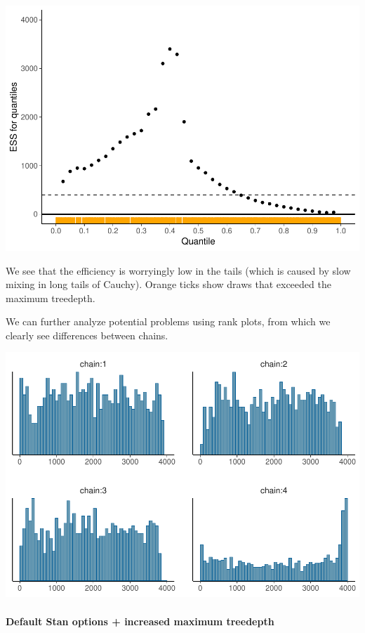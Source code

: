 \documentclass[american,]{article}
\let\oldparagraph\paragraph
\renewcommand{\paragraph}[1]{\oldparagraph{#1}\mbox{}}
\begin{document}
\includegraphics{graphics/quantile-ess-fit-nom-2-1.pdf}

We see that the efficiency is worryingly low in the tails (which is
caused by slow mixing in long tails of Cauchy). Orange ticks show draws
that exceeded the maximum treedepth.

We can further analyze potential problems using rank plots, from which
we clearly see differences between chains.

\includegraphics{graphics/hist-fit-nom-2-1.pdf}

\hypertarget{default-stan-options-increased-maximum-treedepth}{%
\paragraph{Default Stan options + increased maximum
treedepth}\label{default-stan-options-increased-maximum-treedepth}}
\end{document}
